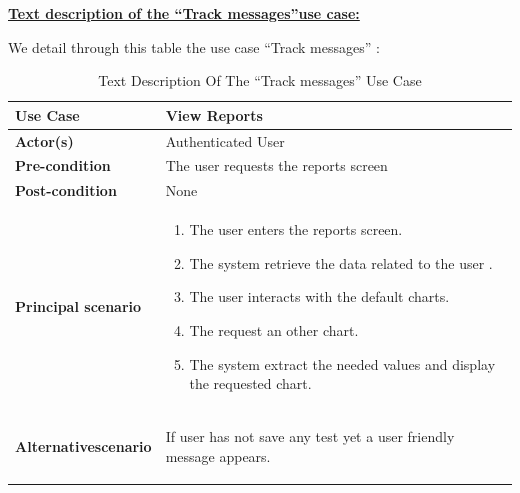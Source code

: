 \textbf{\underline{Text description of the “Track messages”use case:}}

\vspace{0.25cm}

We detail through this table the use case “Track messages” :

\begin{table}[H]
    \renewcommand{\arraystretch}{1.5}
    
   \begin{tabular}{|p{}|p{}|}
   \hline
     
        \textbf{Use Case} & View Reports  \\   \hline
        
        \textbf{Actor(s) } & Authenticated User  \\   \hline
        \textbf{Pre-condition} & The user requests the reports screen \\   \hline
        \textbf{Post-condition} & None  \\   \hline
                \textbf{Principal scenario} & 
                \begin{enumerate}
                    \item The user enters the reports screen.
                    \item The system retrieve the data related to the user .
                    \item The user interacts with the default charts.
                    \item The request an other chart.
                    \item The system extract the needed values and display the requested chart.
                \end{enumerate}  \\   \hline
        
        \textbf{Alternative\newline scenario} & 
        \begin{center}
            
        If user has not save any test yet a user friendly message appears.
        \end{center}
         \\   \hline
\end{tabular}
     \caption{Text Description Of The “Track messages” Use Case}
    \label{tab:my_label}
\end{table}


\newpage

